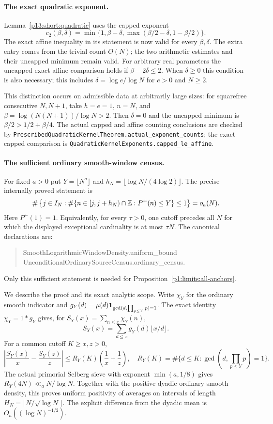 \paragraph{The exact quadratic exponent.}
Lemma~\ref{p13:short:quadratic} uses the capped exponent
\[
 c_2(\beta,\delta)=
 \min\{1,\beta-\delta,\max(\beta/2-\delta,1-\beta/2)\}.
\]
The exact affine inequality in its statement is now valid for every
$\beta,\delta$.  The extra entry comes from the trivial count $O(N)$;
the two arithmetic estimates and their uncapped minimum remain valid.
For arbitrary real parameters the uncapped exact affine comparison holds if
$\beta-2\delta\leq2$.  When $\delta\geq0$ this condition is also
necessary; this includes $\delta=\log e/\log N$ for $e>0$ and $N\geq2$.

This distinction occurs on admissible data at arbitrarily large sizes:
for squarefree consecutive $N,N+1$, take $h=e=1$, $n=N$, and
$\beta=\log(N(N+1))/\log N>2$.  Then $\delta=0$ and the uncapped
minimum is $\beta/2>1/2+\beta/4$.
The actual capped and affine counting conclusions are checked by
\texttt{PrescribedQuadraticKernelTheorem.actual\_exponent\_counts};
the exact capped comparison is
\texttt{QuadraticKernelExponents.capped\_le\_affine}.

\ifdefined\PoneTechnicalCompanion
\paragraph{The sufficient ordinary smooth-window census.}
For fixed $a>0$ put $Y=\lfloor N^a\rfloor$ and
$h_N=\lfloor\log N/(4\log2)\rfloor$.
The precise internally proved statement is
\[
 \#\left\{j\in I_N:
   \#\{n\in[j,j+h_N)\cap\mathbb Z:P^+(n)\leq Y\}\leq1\right\}
   =o_a(N).
\]
Here $P^+(1)=1$.  Equivalently, for every $\tau>0$, one cutoff
precedes all $N$ for which the displayed exceptional cardinality
is at most $\tau N$.  The canonical declarations are:
\begin{quote}\small\ttfamily
SmoothLogarithmicWindowDensity.uniform\_bound\\
UnconditionalOrdinarySourceCensus.ordinary\_census.
\end{quote}
Only this sufficient statement is needed for
Proposition~\ref{p1:limits:all-anchors}.

We describe the proof and its exact analytic scope.
Write $\chi_Y$ for the ordinary smooth indicator and
$g_Y(d)=\mu(d)\mathbf 1_{\gcd(d,\prod_{p\leq Y}p)=1}$.
The exact identity $\chi_Y=1*g_Y$ gives, for
$S_Y(x)=\sum_{n\leq x}\chi_Y(n)$,
\[
 S_Y(x)=\sum_{d\leq x}g_Y(d)\lfloor x/d\rfloor .
\]
For a common cutoff $K\geq x,z>0$,
\[
 \left|\frac{S_Y(x)}x-\frac{S_Y(z)}z\right|
 \leq R_Y(K)\left(\frac1x+\frac1z\right),
 \quad
 R_Y(K)=\#\{d\leq K:\gcd(d,\prod_{p\leq Y}p)=1\}.
\]
The actual primorial Selberg sieve with exponent
$\min(a,1/8)$ gives $R_Y(4N)\ll_a N/\log N$.
Together with the positive dyadic ordinary smooth density, this proves
uniform positivity of averages on intervals of length
$H_N=\lceil N/\sqrt{\log N}\rceil$.
The explicit difference from the dyadic mean is
$O_a((\log N)^{-1/2})$.

